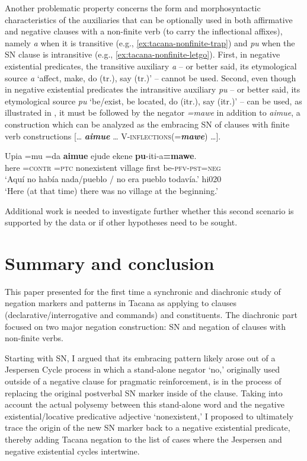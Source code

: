\documentclass[output=paper]{langsci/langscibook}
\begin{document}
Another problematic property concerns the form and morphosyntactic
characteristics of the auxiliaries that can be optionally used in both
affirmative and negative clauses with a non-finite verb (to carry the
inflectional affixes), namely \textit{a} when it is transitive (e.g.,
\ref{ex:tacana-nonfinite-trap}) and \textit{pu} when the SN clause is
intransitive (e.g., \ref{ex:tacana-nonfinite-letgo}). First, in negative
existential predicates, the transitive auxiliary \textit{a} -- or better
said, its etymological source \textit{a} `affect, make, do (tr.), say
(tr.)' -- cannot be used. Second, even though in negative existential
predicates the intransitive auxiliary \textit{pu} -- or better said, its
etymological source \textit{pu} `be\slash exist, be located, do (itr.), say
(itr.)' -- can be used, as illustrated in , it must
be followed by the negator \textit{=mawe} in addition to \textit{aimue}, a
construction which can be analyzed as the embracing SN of clauses with
finite verb constructions [… \textbf{\textit{aimue}} …
V-\textsc{inflections}(=\textbf{\textit{mawe}}) …].
%
\begin{exe}\ex
\label{ex:tacana-beginning}
\gll Upia  =mu  =da  \textbf{aimue}  ejude  ekene
\textbf{pu}{-iti-a}\textbf{=mawe}.\\
 here  =\textsc{contr}  \textsc{=ptc}  nonexistent  village  first
 be\textsc{-pfv-pst=neg}\\
\glt `Aquí no había nada/pueblo / no era pueblo todavía.' hi020\\
`Here (at that time) there was no village at the beginning.'
\end{exe}

Additional work is needed to investigate further whether this second scenario is supported by the data or if other hypotheses need to be sought.

\section{Summary and conclusion}\label{sec:tacana-11}

This paper presented for the first time a synchronic and diachronic study of negation markers and patterns in Tacana as applying to clauses (declarative\slash interrogative and commands) and constituents. The diachronic part focused on two major negation construction: SN and negation of clauses with non-finite verbs.

Starting with SN, I argued that its embracing pattern likely arose out of a
Jespersen Cycle process in which a stand-alone negator `no,' originally
used outside of a negative clause for pragmatic reinforcement, is in the
process of replacing the original postverbal SN marker inside of the
clause. Taking into account the actual polysemy between this stand-alone
word and the negative existential\slash locative predicative adjective
‘nonexistent,' I proposed to ultimately trace the origin of the new SN
marker back to a negative existential predicate, thereby adding Tacana
negation to the list of cases where the Jespersen and negative existential cycles intertwine.
\end{document}
